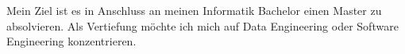 \documentclass[9pt]{developercv} %
\begin{document}
\vspace{0.5cm}



\begin{minipage}[t]{0.4\textwidth} %
	\vspace{-\baselineskip} %

Mein Ziel ist es in Anschluss an meinen Informatik Bachelor einen Master zu absolvieren. Als Vertiefung möchte ich mich auf Data Engineering oder Software Engineering konzentrieren. \\
\end{minipage}
\hfill %
\begin{minipage}[t]{0.5\textwidth} %
	\vspace{-\baselineskip} %
	\begin{barchart}{5.5}
	\end{barchart}
\end{minipage}



\end{document}
